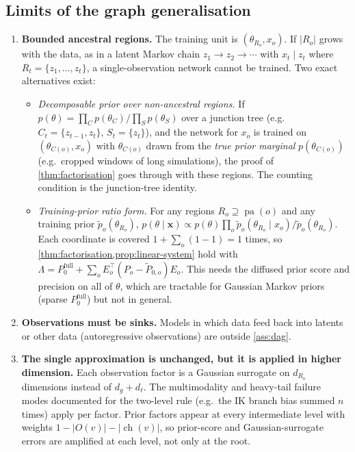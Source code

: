 \documentclass[11pt]{article}
\theoremstyle{definition}
\theoremstyle{remark}
\newcommand{\T}{\top}
\newcommand{\X}{\mathbf{x}}
\newcommand{\pa}{\operatorname{pa}}
\newcommand{\ch}{\operatorname{ch}}
\begin{document}
\subsection{Limits of the graph generalisation}\label{sec:dag-limits}

\begin{enumerate}
\item \textbf{Bounded ancestral regions.} The training unit is $(\theta_{R_o},x_o)$.
 If $|R_o|$ grows with the data, as in a latent Markov chain
 $z_1\to z_2\to\cdots$ with $x_t\mid z_t$ where $R_t=\{z_1,\dots,z_t\}$, a
 single-observation network cannot be trained. Two exact alternatives exist:
 \begin{itemize}
 \item[(a)] \emph{Decomposable prior over non-ancestral regions.} If
  $p(\theta)=\prod_Cp(\theta_C)/\prod_Sp(\theta_S)$ over a junction tree
  (e.g.\ $C_t=\{z_{t-1},z_t\}$, $S_t=\{z_t\}$), and the network for $x_o$ is
  trained on $(\theta_{C(o)},x_o)$ with $\theta_{C(o)}$ drawn from the
  \emph{true prior marginal} $p(\theta_{C(o)})$ (e.g.\ cropped windows of long
  simulations), the proof of \cref{thm:factorisation} goes through with these
  regions. The counting condition is the junction-tree identity.
 \item[(b)] \emph{Training-prior ratio form.} For any regions $R_o\supseteq\pa(o)$
  and any training prior $\tilde p_o(\theta_{R_o})$,
  $p(\theta\mid\X)\propto p(\theta)\prod_o\tilde p_o(\theta_{R_o}\mid x_o)/\tilde p_o(\theta_{R_o})$.
  Each coordinate is covered $1+\sum_o(1-1)=1$ times, so
  \cref{thm:factorisation,prop:linear-system} hold with
  $\Lambda=P_0^{\text{full}}+\sum_oE_o^\T(P_o-\tilde P_{0,o})E_o$. This needs the
  diffused prior score and precision on all of $\theta$, which are tractable for
  Gaussian Markov priors (sparse $P_0^{\text{full}}$) but not in general.
 \end{itemize}
\item \textbf{Observations must be sinks.} Models in which data feed back into
 latents or other data (autoregressive observations) are outside
 \cref{ass:dag}.
\item \textbf{The single approximation is unchanged, but it is applied in
 higher dimension.} Each observation factor is a Gaussian surrogate on
 $d_{R_o}$ dimensions instead of $d_g+d_\ell$. The multimodality and
 heavy-tail failure modes documented for the two-level rule (e.g.\ the IK branch
 bias summed $n$ times) apply per factor. Prior factors appear at every
 intermediate level with weights $1-|O(v)|-|\ch(v)|$, so prior-score and
 Gaussian-surrogate errors are amplified at each level, not only at the root.
\end{enumerate}
\end{document}
